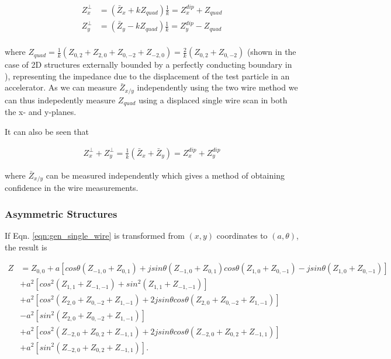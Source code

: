 \begin{align}
Z^{\perp}_{x} & = \left( \bar{Z}_{x} + kZ_{quad} \right)\frac{1}{k} =  Z^{dip}_{x} + Z_{quad}\\
Z^{\perp}_{y} & = \left( \bar{Z}_{y} - kZ_{quad} \right)\frac{1}{k}= Z^{dip}_{y} - Z_{quad} \\
\end{align}

where $Z_{quad}=\frac{1}{k}\left( Z_{0,2}+Z_{2,0}+Z_{0,-2}+Z_{-2,0}  \right) = \frac{2}{k}\left( Z_{0,2}+Z_{0,-2}  \right)$ (shown in the case of 2D structures externally bounded by a perfectly conducting boundary in \cite{Tsutsui:OnSingleWire}), representing the impedance due to the displacement of the test particle in an accelerator. As we can measure $\bar{Z}_{x/y}$ independently using the two wire method we can thus indepedently measure $Z_{quad}$ using a displaced single wire scan in both the x- and y-planes.

It can also be seen that

\begin{align}
Z^{\perp}_{x} + Z^{\perp}_{y} = \frac{1}{k}\left( \bar{Z}_{x} + \bar{Z}_{y} \right) = Z^{dip}_{x} + Z^{dip}_{y}
\end{align}

where $\bar{Z}_{x/y}$ can be measured independently which gives a method of obtaining confidence in the wire measurements.

\subsubsection{Asymmetric Structures}

If Eqn. \ref{eqn:gen_single_wire} is transformed from $\left( x,y \right)$ coordinates to $\left( a, \theta \right)$, the result is

\begin{align}
Z &=Z_{0,0} +a\left[ cos\theta \left( Z_{-1,0} + Z_{0,1} \right) +jsin\theta \left( Z_{-1,0} + Z_{0,1} \right)  cos\theta \left( Z_{1,0} + Z_{0,-1} \right) - jsin\theta \left( Z_{1,0} + Z_{0,-1} \right)\right] \nonumber \\
   &+a^{2}\left[ cos^{2} \left( Z_{1,1} + Z_{-1,-1} \right) + sin^{2} \left( Z_{1,1} + Z_{-1,-1} \right)\right] \nonumber \\
   &+a^{2}\left[ cos^{2} \left( Z_{2,0} + Z_{0,-2} +Z_{1,-1} \right) +2jsin\theta cos\theta\left( Z_{2,0} + Z_{0,-2} +Z_{1,-1} \right) \right] \nonumber \\
   & - a^{2}\left[sin^{2} \left( Z_{2,0} + Z_{0,-2} +Z_{1,-1} \right)\right] \nonumber  \\
   &+ a^{2}\left[ cos^{2} \left( Z_{-2,0} + Z_{0,2} +Z_{-1,1} \right) +2jsin\theta cos\theta\left( Z_{-2,0} + Z_{0,2} +Z_{-1,1}  \right) \right] \nonumber \\
   &+ a^{2}\left[sin^{2} \left( Z_{-2,0} + Z_{0,2} +Z_{-1,1}  \right) \right].
\end{align}

